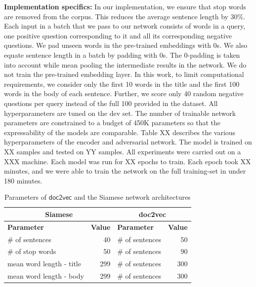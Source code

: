 \documentclass{sigkddExp}
\begin{document}
\textbf{Implementation specifics:}
In our implementation, we ensure that stop words are removed from the corpus. This reduces the average sentence length by 30\%. Each input in a batch that we pass to our network consists of words in a query, one positive question corresponding to it and all its corresponding negative questions. We pad unseen words in the pre-trained embeddings with 0s. We also equate sentence length in a batch by padding with 0s. The 0-padding is taken into account while mean pooling the intermediate results in the network. We do not train the pre-trained embedding layer. In this work, to limit computational requirements, we consider only the first 10 words in the title and the first 100 words in the body of each sentence. Further, we score only 40 random negative questions per query instead of the full 100 provided in the dataset. All hyperparameters are tuned on the dev set. The number of trainable network parameters are constrained to a budget of 450K parameters so that the expressability of the models are comparable. Table {\color{red} XX} describes the various hyperparameters of the encoder and adversarial network. The model is trained on {\color{red} XX samples and tested on YY samples. All experiments were carried out on a XXX machine. Each model was run for {\color{red} XX epochs} to train. Each epoch took XX minutes, and we were able to train the network on the full training-set in under 180 minutes.}
\begin{table}[h]
 \begin{tabular}{l|r|l|r}
          \multicolumn{2}{c|}{\textbf{Siamese}}
         & \multicolumn{2}{c}{\textbf{\textsf{doc2vec}}}
         \\
         \toprule
         \textbf{Parameter}
         & \textbf{Value}
         & \textbf{Parameter}
         & \textbf{Value}
         \\
         \midrule
         \# of sentences
         & 40
         & \# of sentences
         & 50
         \\
         \# of stop words 
         & 50
         & \# of sentences
         & 90
         \\
         mean word length - title
         & 299
         & \# of sentences
         & 300
         \\
         mean word length - body
         & 299
         & \# of sentences
         & 300
    \end{tabular}
    \caption{Parameters of $\mathsf{doc2vec}$ and the Siamese network architectures}
    \label{tab:indomain}
\end{table}
\end{document}
